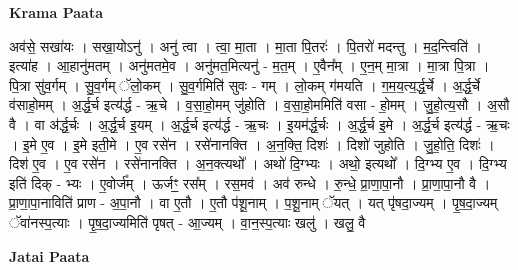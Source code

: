 \documentclass[17pt]{extarticle}
\begin{document}
\textbf{Krama Paata} \newline

अव॑से॒ सखा॑यः । सखा॒योऽनु॑ । अनु॑ त्वा । त्वा॒ मा॒ता । मा॒ता पि॒तरः॑ । पि॒तरो॑ मदन्तु । म॒द॒न्त्विति॑ । इत्या॑ह । आ॒हानु॑मतम् । अनु॑मतमे॒व । अनु॑मत॒मित्यनु॑ - म॒त॒म् । ए॒वैन᳚म् । ए॒न॒म् मा॒त्रा । मा॒त्रा पि॒त्रा । पि॒त्रा सु॑व॒र्गम् । सु॒व॒र्गम् ॅलो॒कम् । सु॒व॒र्गमिति॑ सुवः - गम् । लो॒कम् ग॑मयति । ग॒म॒य॒त्य॒र्द्ध॒र्चे । अ॒र्द्ध॒र्चे व॑साहो॒मम् । अ॒र्द्ध॒र्च इत्य॑र्द्ध - ऋ॒चे । व॒सा॒हो॒मम् जु॑होति । व॒सा॒हो॒ममिति॑ वसा - हो॒मम् । जु॒हो॒त्य॒सौ । अ॒सौ वै । वा अ॑र्द्ध॒र्चः । अ॒र्द्ध॒र्च इ॒यम् । अ॒र्द्ध॒र्च इत्य॑र्द्ध - ऋ॒चः । इ॒यम॑र्द्ध॒र्चः । अ॒र्द्ध॒र्च इ॒मे । अ॒र्द्ध॒र्च इत्य॑र्द्ध - ऋ॒चः । इ॒मे ए॒व । इ॒मे इती॒मे । ए॒व रसे॑न । रसे॑नानक्ति । अ॒न॒क्ति॒ दिशः॑ । दिशो॑ जुहोति । जु॒हो॒ति॒ दिशः॑ । दिश॑ ए॒व । ए॒व रसे॑न । रसे॑नानक्ति । अ॒न॒क्त्यथो᳚ । अथो॑ दि॒ग्भ्यः । अथो॒ इत्यथो᳚ । दि॒ग्भ्य ए॒व । दि॒ग्भ्य इति॑ दिक् - भ्यः । ए॒वोर्ज᳚म् । ऊर्जꣳ॒॒ रस᳚म् । रस॒मव॑ । अव॑ रुन्धे । रु॒न्धे॒ प्रा॒णा॒पा॒नौ । प्रा॒णा॒पा॒नौ वै । प्रा॒णा॒पा॒नाविति॑ प्राण - अ॒पा॒नौ । वा ए॒तौ । ए॒तौ प॑शू॒नाम् । प॒शू॒नाम् ॅयत् । यत् पृ॑षदा॒ज्यम् । पृ॒ष॒दा॒ज्यम् ॅवा॑नस्प॒त्याः । पृ॒ष॒दा॒ज्यमिति॑ पृषत् - आ॒ज्यम् । वा॒न॒स्प॒त्याः खलु॑ । खलु॒ वै \newline

\textbf{Jatai Paata} \newline
\end{document}
